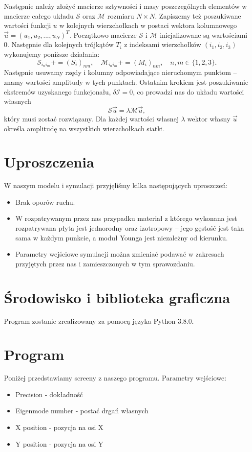 \documentclass{classrep}
\begin{document}
Następnie należy złożyć macierze sztywności i masy poszczególnych elementów w macierze całego układu $\mathcal{S}$ oraz $\mathcal{M}$ rozmiaru $N \times N$. Zapiszemy też poszukiwane wartości funkcji $u$ w kolejnych wierzchołkach w postaci wektora kolumnowego $\Vec{u} = (u_1, u_2, ..., u_N)^T$. Początkowo macierze $\mathcal{S}$ i $\mathcal{M}$ inicjalizowane są wartościami $0$. Następnie dla kolejnych trójkątów $T_i$ z indeksami wierzchołków $(i_1, i_2, i_3)$ wykonujemy poniższe działania:
\begin{equation}
\mathcal{S}_{i_n i_m} += (S_i)_{nm}, \quad \mathcal{M}_{i_n i_m} += (M_i)_{nm}, \quad n, m \in \{1, 2, 3\}.
\end{equation}
Następnie usuwamy rzędy i kolumny odpowiadające nieruchomym punktom -- znamy wartości amplitudy w tych punktach. Ostatnim krokiem jest poszukiwanie ekstremów uzyskanego funkcjonału, $\delta \mathcal{I} = 0$, co prowadzi nas do układu wartości własnych
\begin{equation}
\mathcal{S}\Vec{u} = \lambda \mathcal{M}\Vec{u},
\end{equation}
który musi zostać rozwiązany. Dla każdej wartości własnej $\lambda$ wektor własny $\Vec{u}$ określa amplitudę na wszystkich wierzchołkach siatki.

\section{Uproszczenia}
W naszym modelu i symulacji przyjęliśmy kilka następujących uproszczeń:
\begin{itemize}
	\item Brak oporów ruchu.
	\item W rozpatrywanym przez nas przypadku materiał z którego wykonana jest rozpatrywana płyta jest jednorodny oraz izotropowy -- jego gęstość jest taka sama w każdym punkcie, a moduł Younga jest niezależny od kierunku.
	\item Parametry wejściowe symulacji można zmieniać podawać w zakresach przyjętych przez nas i zamieszczonych w tym sprawozdaniu.
\end{itemize}

\section{Środowisko i biblioteka graficzna}
Program zostanie zrealizowany za pomocą języka Python 3.8.0.

\section{Program}
Poniżej przedstawiamy screeny z naszego programu.
Parametry wejściowe:
\begin{itemize}
    \item Precision - dokładność
    \item Eigenmode number - postać drgań własnych
    \item X position - pozycja na osi X
    \item Y position - pozycja na osi Y
\end{itemize}
\end{document}
